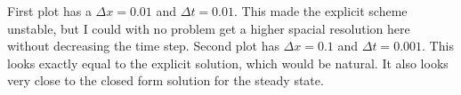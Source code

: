 \documentclass[a4paper, 12pt, titlepage]{article}
\begin{document}
\begin{section}
\begin{subsection}
   First plot has a $\Delta x = 0.01$ and $\Delta t = 0.01$. This made the explicit scheme unstable, but
   I could with no problem get a higher spacial resolution here without decreasing the time step.
   Second plot has $\Delta x = 0.1$ and $\Delta t = 0.001$. This looks exactly equal to the explicit 
   solution, which would be natural. It also looks very close to the closed form solution for the steady state.
   
   \end{subsection}

  \end{section}
  
\end{document}
